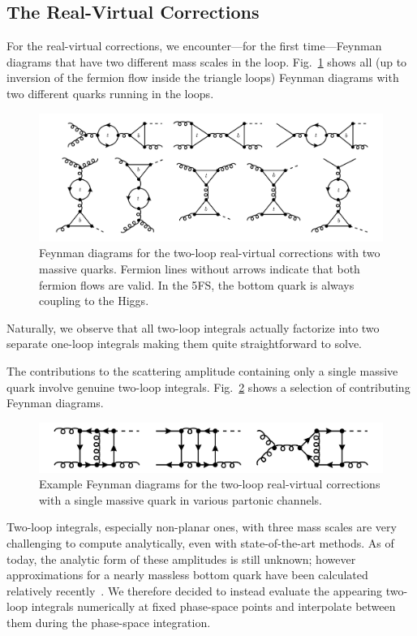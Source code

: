 \subsection{The Real-Virtual Corrections} \label{subsec:5:the_real-virtual_corrections}
For the real-virtual corrections, we encounter---for the first time---Feynman diagrams that have two different mass scales in the loop. Fig.~\ref{fig:5:real_virtual2} shows all (up to inversion of the fermion flow inside the triangle loops) Feynman diagrams with two different quarks running in the loops.
\begin{figure}[ht]
  \centering
  \includegraphics[width=\textwidth]{Images/NNLO_Feynman_diagrams/RealVirtual2.pdf}
  \caption{Feynman diagrams for the two-loop real-virtual corrections with two massive quarks. Fermion lines without arrows indicate that both fermion flows are valid. In the 5\acs{FS}, the bottom quark is always coupling to the Higgs.}
  \label{fig:5:real_virtual2}
\end{figure}
Naturally, we observe that all two-loop integrals actually factorize into two separate one-loop integrals making them quite straightforward to solve.

The contributions to the scattering amplitude containing only a single massive quark involve genuine two-loop integrals. Fig.~\ref{fig:5:real_virtual1} shows a selection of contributing Feynman diagrams.
\begin{figure}[ht]
  \centering
  \includegraphics[width=\figurewidth]{Images/NNLO_Feynman_diagrams/RealVirtual1.pdf}
  \caption{Example Feynman diagrams for the two-loop real-virtual corrections with a single massive quark in various partonic channels.}
  \label{fig:5:real_virtual1}
\end{figure}
Two-loop integrals, especially non-planar ones, with three mass scales are very challenging to compute analytically, even with state-of-the-art methods. As of today, the analytic form of these amplitudes is still unknown; however approximations for a nearly massless bottom quark have been calculated relatively recently~\cite{Melnikov:2016qoc, Melnikov:2017pgf}. We therefore decided to instead evaluate the appearing two-loop integrals numerically at fixed phase-space points and interpolate between them during the phase-space integration.

